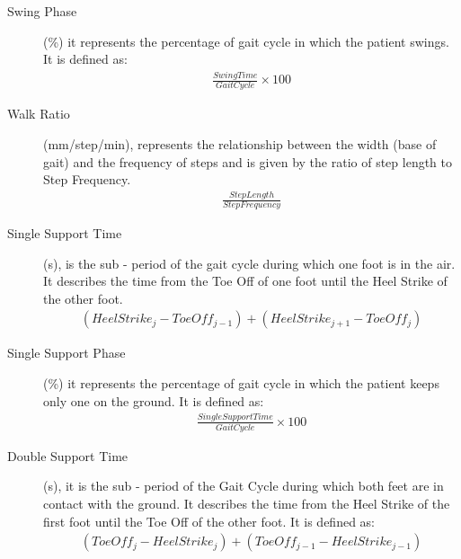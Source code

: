 \begin{description}
\item[Swing Phase] (\%) it represents the percentage of gait cycle in which the patient swings. It is defined as:
\begin{equation}
\begin{aligned}
\frac{Swing Time}{Gait Cycle} \times 100
\end{aligned}
\end{equation}

\item[Walk Ratio]
(mm/step/min), represents the relationship between the width (base of gait) and the frequency of steps and is given by the ratio of step length to Step Frequency.
\begin{equation}
\begin{aligned}
\frac{Step Length}{Step Frequency}
\end{aligned}
\end{equation}

\item[Single Support Time] 
(s), is the sub - period of the gait cycle during which one foot is in the air. It describes the time from the Toe Off of one foot until the Heel Strike of the other foot.
\begin{equation}
\begin{aligned}
(Heel Strike_j - Toe Off_{j-1}) + (Heel Strike_{j+1} - Toe Off_{j})
\end{aligned}
\end{equation}

\item[Single Support Phase] (\%) it represents the percentage of gait cycle in which the patient keeps only one on the ground. It is defined as:
\begin{equation}
\begin{aligned}
\frac{Single Support Time}{Gait Cycle} \times 100
\end{aligned}
\end{equation}

\item[Double Support Time] 
(s), it is the sub - period of the Gait Cycle during which both feet are in contact
with the ground. It describes the time from the Heel Strike of the first foot until the Toe Off of the other foot. It is defined as:
\begin{equation}
\begin{aligned}
(Toe Off_j - Heel Strike_j) + (Toe Off_{j-1} - Heel Strike_{j-1})
\end{aligned}
\end{equation}


\end{description}
